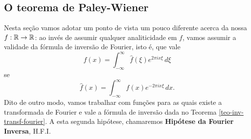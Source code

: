     \subsection{O teorema de Paley-Wiener}
        Nesta seção vamos adotar um ponto de vista um pouco diferente acerca da nossa $f:\mathbb{R}\to\mathbb{R}$: 
        ao invés de assumir qualquer analiticidade em $f$, vamos assumir a validade da fórmula de 
        inversão de Fourier, isto é,
        que vale
        \begin{equation*}
            f(x) = \int_{-\infty}^{\infty} \widehat{f}(\xi) e^{2\pi ix\xi} \, d\xi
        \end{equation*}
        se
        \begin{equation*}
            \widehat{f}(x) = \int_{-\infty}^{\infty} f(x) e^{-2\pi ix\xi} \, dx.
        \end{equation*}
        Dito de outro modo, vamos trabalhar com funções para as quais existe a transformada de Fourier
        e vale a fórmula de inversão dada no Teorema \ref{teo-inv-transf-fourier}. A esta segunda
        hipótese, chamaremos {\bf Hipótese da Fourier Inversa}, H.F.I.
        

